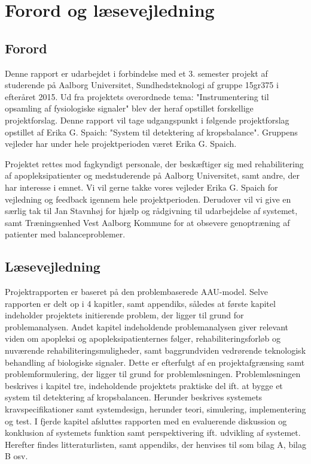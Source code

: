 \chapter*{Forord og læsevejledning}
\section{Forord}
Denne rapport er udarbejdet i forbindelse med et 3. semester projekt af studerende på Aalborg Universitet,  Sundhedsteknologi af gruppe 15gr375 i efteråret 2015. Ud fra projektets overordnede tema: "Instrumentering til opsamling af fysiologiske signaler" blev der heraf opstillet forskellige projektforslag. Denne rapport vil tage udgangspunkt i følgende projektforslag opstillet af Erika G. Spaich: "System til detektering af kropsbalance". Gruppens vejleder har under hele projektperioden været Erika G. Spaich.

Projektet rettes mod fagkyndigt personale, der beskæftiger sig med rehabilitering af apopleksipatienter og medstuderende på Aalborg Universitet, samt andre, der har interesse i emnet. 
Vi vil gerne takke vores vejleder Erika G. Spaich for vejledning og feedback igennem hele projektperioden. Derudover vil vi give en særlig tak til Jan Stavnhøj for hjælp og rådgivning til udarbejdelse af systemet, samt Træningsenhed Vest Aalborg Kommune for at obsevere genoptræning af patienter med balanceproblemer. 

\section{Læsevejledning}
Projektrapporten er baseret på den problembaserede AAU-model. Selve rapporten er delt op i 4 kapitler, samt appendiks, således at første kapitel indeholder projektets initierende problem, der ligger til grund for problemanalysen. Andet kapitel indeholdende problemanalysen giver relevant viden om apopleksi og apopleksipatienternes følger, rehabiliteringsforløb og nuværende rehabiliteringsmuligheder, samt baggrundviden vedrørende teknologisk behandling af biologiske signaler.  Dette er efterfulgt af en projektafgrænsing samt problemformulering, der ligger til grund for problemløsningen. Problemløsningen beskrives i kapitel tre, indeholdende projektets praktiske del ift. at bygge et system til detektering af kropsbalancen. Herunder beskrives systemets kravspecifikationer samt systemdesign, herunder teori, simulering, implementering og test. I fjerde kapitel afsluttes rapporten med en evaluerende diskussion og konklusion af systemets funktion samt perspektivering ift. udvikling af systemet. Herefter findes litteraturlisten, samt appendiks, der henvises til som bilag A, bilag B osv. 

